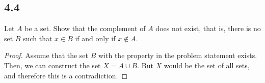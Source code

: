 \subsection*{4.4} Let $A$ be a set. Show that the complement of $A$ does not exist, that is, there is no set $B$ such that $x \in B$ if and only if $x \notin A$.

\begin{proof}
Assume that the set $B$ with the property in the problem statement exists. Then, we can construct the set $X = A \cup B$. But $X$ would be the set of all sets, and therefore this is a contradiction.
\end{proof}

